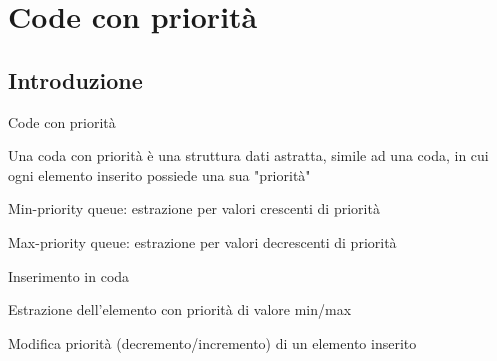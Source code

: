 \section{Code con priorità}
\subsection{Introduzione}

\begin{frame}{Code con priorità}

\vspace{-9pt}
\begin{myboxtitle}
Una \alert{coda con priorità} è una struttura dati astratta, simile ad 
una coda, in cui ogni elemento inserito possiede una sua "\alert{priorità}"
\small
\BIL
\item \alert{Min-priority queue}: estrazione per valori crescenti di priorità
\item \alert{Max-priority queue}: estrazione per valori decrescenti di priorità
\EIL
\end{myboxtitle}

\begin{myboxtitle}
\BIL
\item Inserimento in coda
\item Estrazione dell'elemento con priorità di valore min/max
\item Modifica priorità (decremento/incremento) di un elemento inserito
\EIL
\end{myboxtitle}

\end{frame}

